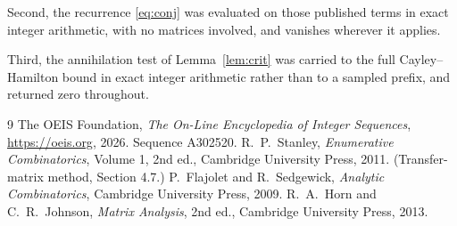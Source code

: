 \documentclass[11pt,a4paper]{article}
\theoremstyle{plain}
\theoremstyle{definition}
\begin{document}
Second, the recurrence \eqref{eq:conj} was evaluated on those published terms in exact
integer arithmetic, with no matrices involved, and vanishes wherever it applies.

Third, the annihilation test of Lemma~\ref{lem:crit} was carried to the full
Cayley--Hamilton bound in exact integer arithmetic rather than to a sampled prefix, and
returned zero throughout.

\begin{thebibliography}{9}
 The OEIS Foundation, \emph{The On-Line Encyclopedia of Integer
Sequences}, \url{https://oeis.org}, 2026. Sequence A302520.
 R.~P.~Stanley, \emph{Enumerative Combinatorics}, Volume 1, 2nd ed.,
Cambridge University Press, 2011. (Transfer-matrix method, Section 4.7.)
 P.~Flajolet and R.~Sedgewick, \emph{Analytic Combinatorics}, Cambridge
University Press, 2009.
 R.~A.~Horn and C.~R.~Johnson, \emph{Matrix Analysis}, 2nd ed., Cambridge
University Press, 2013.
\end{thebibliography}
\end{document}
